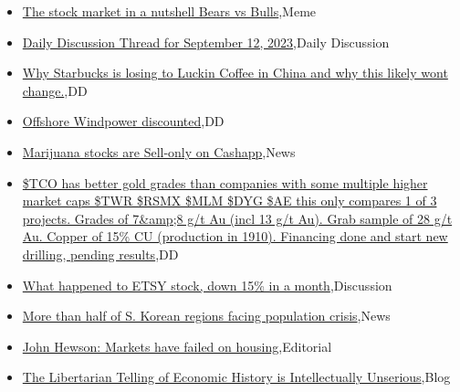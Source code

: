 \documentclass{article}%
\begin{document}
%
\begin{itemize}%
\item%
\href{https://reddit.com/r/wallstreetbets/comments/16gp80d/the\_stock\_market\_in\_a\_nutshell\_bears\_vs\_bulls/}{The stock market in a nutshell Bears vs Bulls},Meme%
\item%
\href{https://reddit.com/r/wallstreetbets/comments/16gn8jj/daily\_discussion\_thread\_for\_september\_12\_2023/}{Daily Discussion Thread for September 12, 2023},Daily Discussion%
\item%
\href{https://reddit.com/r/wallstreetbets/comments/16gmwf3/why\_starbucks\_is\_losing\_to\_luckin\_coffee\_in\_china/}{Why Starbucks is losing to Luckin Coffee in China and why this likely wont change.},DD%
\item%
\href{https://reddit.com/r/wallstreetbets/comments/16gmap2/offshore\_windpower\_discounted/}{Offshore Windpower discounted},DD%
\item%
\href{https://reddit.com/r/wallstreetbets/comments/16glm8y/marijuana\_stocks\_are\_sellonly\_on\_cashapp/}{Marijuana stocks are Sell-only on Cashapp},News%
\item%
\href{https://reddit.com/r/Baystreetbets/comments/16g5a2k/tco\_has\_better\_gold\_grades\_than\_companies\_with/}{\$TCO has better gold grades than companies with some multiple higher market caps \$TWR \$RSMX \$MLM \$DYG \$AE this only compares 1 of 3 projects. Grades of 7\&amp;8 g/t Au (incl 13 g/t Au). Grab sample of 28 g/t Au. Copper of 15\% CU (production in 1910). Financing done and start new drilling, pending results},DD%
\item%
\href{https://reddit.com/r/StockMarket/comments/16g859s/what\_happened\_to\_etsy\_stock\_down\_15\_in\_a\_month/}{What happened to ETSY stock, down 15\% in a month},Discussion%
\item%
\href{https://reddit.com/r/Economics/comments/16gk9em/more\_than\_half\_of\_s\_korean\_regions\_facing/}{More than half of S. Korean regions facing population crisis},News%
\item%
\href{https://reddit.com/r/Economics/comments/16g941k/john\_hewson\_markets\_have\_failed\_on\_housing/}{John Hewson: Markets have failed on housing},Editorial%
\item%
\href{https://reddit.com/r/Economics/comments/16g86gl/the\_libertarian\_telling\_of\_economic\_history\_is/}{The Libertarian Telling of Economic History is Intellectually Unserious},Blog%
\end{itemize}%
\end{document}
